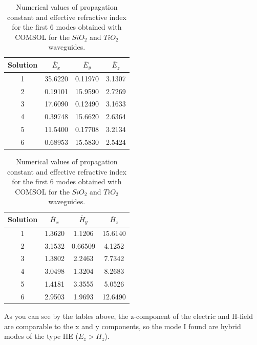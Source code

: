 \documentclass[a4paper,12pt]{article}
\begin{document}
\begin{table}[H]
    \centering
    \begin{subtable}{0.45\textwidth}
        \centering
        \begin{tabular}{cccc}
            \toprule
            Solution & $\overline{E}_x$ & $\overline{E}_y$ & $\overline{E}_z$ \\
            \midrule
            1 & 35.6220 & 0.11970 & 3.1307 \\
            2 & 0.19101 & 15.9590 & 2.7269 \\
            3 & 17.6090 & 0.12490 & 3.1633 \\
            4 & 0.39748 & 15.6620 & 2.6364 \\
            5 & 11.5400 & 0.17708 & 3.2134 \\
            6 & 0.68953 & 15.5830 & 2.5424 \\
            \bottomrule
        \end{tabular}
        \caption{Electric field. The components are in $V/m$.}
    \end{subtable}
    \hfill
    \begin{subtable}{0.45\textwidth}
        \centering
        \begin{tabular}{cccc}
            \toprule
            Solution & $\overline{H}_x$ & $\overline{H}_y$ & $\overline{H}_z$ \\
            \midrule
            1 & 1.3620 & 1.1206 & 15.6140 \\
            2 & 3.1532 & 0.66509 & 4.1252 \\
            3 & 1.3802 & 2.2463 & 7.7342 \\
            4 & 3.0498 & 1.3204 & 8.2683 \\
            5 & 1.4181 & 3.3555 & 5.0526 \\
            6 & 2.9503 & 1.9693 & 12.6490 \\
            \bottomrule
        \end{tabular}
        \caption{H-field. The components are in $[\cdot 10^{-3} H/m]$.}
    \end{subtable}
    \caption{Numerical values of propagation constant and effective refractive index for the first 6 modes obtained with COMSOL for the $SiO_2$ and $TiO_2$ waveguides.}
    \label{tab:beta_num}
\end{table}

As you can see by the tables above, the z-component of the electric and H-field are comparable to the x and y components, so the mode I found are hybrid modes of the type HE ($E_z > H_z$).
\end{document}
